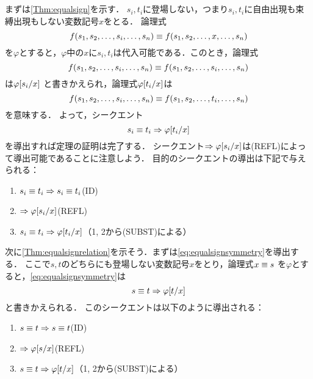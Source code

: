 \subsection*{}

まずは\cref{Thm:equalsign}を示す．
\(s_i, t_i\)に登場しない，つまり\(s_i, t_i\)に自由出現も束縛出現もしない変数記号\(x\)をとる．
論理式
\begin{equation*}
	\apply{f}{s_1, s_2, \dots, s_i, \dots, s_n} \objeq \apply{f}{s_1, s_2, \dots, x, \dots, s_n}
\end{equation*}
を\(\varphi\)とすると，\(\varphi\)中の\(x\)に\(s_i, t_i\)は代入可能である．このとき，論理式
\begin{equation*}
	\apply{f}{s_1, s_2, \dots, s_i, \dots, s_n} \objeq \apply{f}{s_1, s_2, \dots, s_i, \dots, s_n}
\end{equation*}
は\(\subst{\varphi}{s_i /x}\)
と書きかえられ，論理式\(\subst{\varphi}{t_i / x}\)は
\begin{equation*}
	\apply{f}{s_1, s_2, \dots, s_i, \dots, s_n} \objeq \apply{f}{s_1, s_2, \dots, t_i, \dots, s_n}
\end{equation*}
を意味する．
よって，シークエント
\begin{equation*}
	s_i \objeq t_i \sequent \subst{\varphi}{t_i / x}
\end{equation*}
を導出すれば定理の証明は完了する．
シークエント\(\sequent \subst{\varphi}{s_i / x}\)は(REFL)によって導出可能であることに注意しよう．
目的のシークエントの導出は下記で与えられる：
\begin{enumerate}
	\item \(s_i \equiv t_i \Rightarrow s_i \equiv t_i\)\quad (ID)
	\item \(\sequent \subst{\varphi}{s_i / x}\)\quad (REFL)
	\item \(s_i \objeq t_i \sequent \subst{\varphi}{t_i / x}\)\quad （1, 2から(SUBST)による）
\end{enumerate}

次に\cref{Thm:equalsignrelation}を示そう．まずは\cref{eq:equalsignsymmetry}を導出する．
ここで\(s, t\)のどちらにも登場しない変数記号\(x\)をとり，論理式\(x \equiv s\)
を\(\varphi\)とすると，\cref{eq:equalsignsymmetry}は
\begin{equation*}
	s \objeq t \sequent \subst{\varphi}{t / x}
\end{equation*}
と書きかえられる．
このシークエントは以下のように導出される：
\begin{enumerate}
	\item \(s \equiv t \Rightarrow s \equiv t\)\quad (ID)
	\item \(\sequent \subst{\varphi}{s/x}\)\quad (REFL)
	\item \(s \objeq t \sequent \subst{\varphi}{t/x}\)\quad （1, 2から(SUBST)による）
\end{enumerate}

